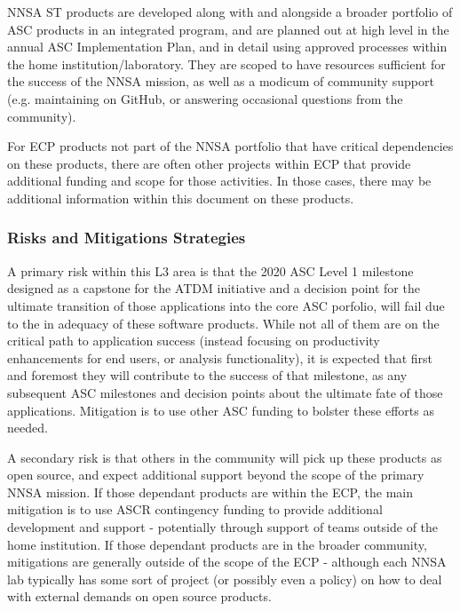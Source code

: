 NNSA ST products are developed along with and alongside a broader
portfolio of ASC products in an integrated program, and are planned
out at high level in the annual ASC Implementation Plan, and in detail
using approved processes within the home institution/laboratory. They
are scoped to have 
resources sufficient for the success of the NNSA mission, as well as a
modicum of community support (e.g. maintaining on GitHub, or answering
occasional questions from the community).

For ECP products not part of the NNSA portfolio that have critical
dependencies on these products, there are often other projects within
ECP that provide additional funding and scope for those activities. In
those cases, there may be additional information within this document
on these products.


\subsubsection{Risks and Mitigations Strategies}

A primary risk within this L3 area is that the 2020 ASC Level 1 milestone
designed as a capstone for the ATDM initiative and a decision point
for the ultimate transition of those applications into the core ASC
porfolio, will fail due to the in adequacy of these software
products. While not all of them are on the critical path to
application success (instead focusing on productivity enhancements for
end users, or analysis functionality), it is expected that first and
foremost they will contribute to the success of that milestone, as any
subsequent ASC milestones and decision points about the ultimate fate
of those applications. Mitigation is to use other ASC funding to bolster these
efforts as needed.

A secondary risk is that others in the community will pick up these
products as open source, and expect additional support beyond the
scope of the primary NNSA mission. If those dependant products are within the
ECP, the main mitigation is to use ASCR contingency funding to provide
additional development and support - potentially through support of teams
outside of the home institution. If those dependant products are in
the broader community, mitigations are generally outside of the scope
of the ECP - although each NNSA lab typically has some sort of project
(or possibly even a policy) on how to deal with external demands on
open source products.



